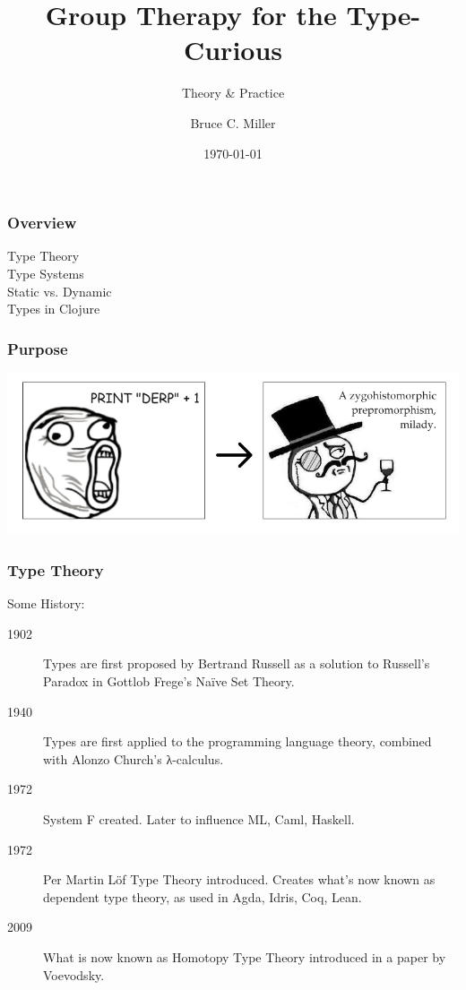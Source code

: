 \documentclass{beamer}
\title{Group Therapy for the Type-Curious}
\subtitle{Theory \& Practice}
\author{Bruce C. Miller}
\institute{bm3719@gmail.com}
\date{\today}
\begin{document}
\begin{frame}
\titlepage
\end{frame}

\begin{frame}
\frametitle{Overview}

\begin{description}
\item[Type Theory]
\item[Type Systems]
\item[Static vs. Dynamic]
\item[Types in Clojure]
\end{description}

\end{frame}


\begin{frame}
  \frametitle{Purpose}

  \centerline{\includegraphics[scale=0.4]{img/transformation.png}}

\end{frame}


\begin{frame}
  \frametitle{Type Theory}

  Some History:
\begin{description}
\item[1902] Types are first proposed by Bertrand Russell as a solution to
  Russell's Paradox in Gottlob Frege's Naïve Set Theory.
\item[1940] Types are first applied to the programming language theory,
  combined with Alonzo Church's λ-calculus.
\item[1972] System F created.  Later to influence ML, Caml, Haskell.
\item[1972] Per Martin Löf Type Theory introduced.  Creates what's now known as
  dependent type theory, as used in Agda, Idris, Coq, Lean.
\item[2009] What is now known as Homotopy Type Theory introduced in a paper by
  Voevodsky.
\end{description}


\end{frame}
\end{document}
